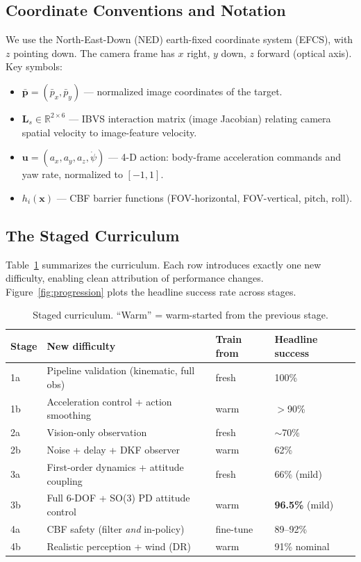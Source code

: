 \documentclass[11pt]{article}
\begin{document}
\subsection{Coordinate Conventions and Notation}
We use the North-East-Down (NED) earth-fixed coordinate system (EFCS), with
$z$ pointing down. The camera frame has $x$ right, $y$ down, $z$ forward
(optical axis). Key symbols:
\begin{itemize}[nosep]
  \item $\bar{\mathbf{p}}=(\bar p_x,\bar p_y)$ --- normalized image
  coordinates of the target.
  \item $\mathbf{L}_s\in\mathbb{R}^{2\times6}$ --- IBVS interaction matrix
  (image Jacobian) relating camera spatial velocity to image-feature velocity.
  \item $\mathbf{u}=(a_x,a_y,a_z,\dot\psi)$ --- 4-D action: body-frame
  acceleration commands and yaw rate, normalized to $[-1,1]$.
  \item $h_i(\mathbf{x})$ --- CBF barrier functions (FOV-horizontal,
  FOV-vertical, pitch, roll).
\end{itemize}

\subsection{The Staged Curriculum}
Table~\ref{tab:roadmap} summarizes the curriculum. Each row introduces
exactly one new difficulty, enabling clean attribution of performance changes.
Figure~\ref{fig:progression} plots the headline success rate across stages.

\begin{table}[H]\centering\small
\caption{Staged curriculum. ``Warm'' = warm-started from the previous stage.}
\label{tab:roadmap}
\begin{tabular}{@{}llll@{}}
\toprule
Stage & New difficulty & Train from & Headline success \\
\midrule
1a & Pipeline validation (kinematic, full obs) & fresh & 100\% \\
1b & Acceleration control + action smoothing & warm & $>$90\% \\
2a & Vision-only observation & fresh & $\sim$70\% \\
2b & Noise + delay + DKF observer & warm & 62\% \\
3a & First-order dynamics + attitude coupling & fresh & 66\% (mild) \\
3b & Full 6-DOF + SO(3) PD attitude control & warm & \textbf{96.5\%} (mild) \\
4a & CBF safety (filter \emph{and} in-policy) & fine-tune & 89--92\% \\
4b & Realistic perception + wind (DR) & warm & 91\% nominal \\
\bottomrule
\end{tabular}
\end{table}
\end{document}
